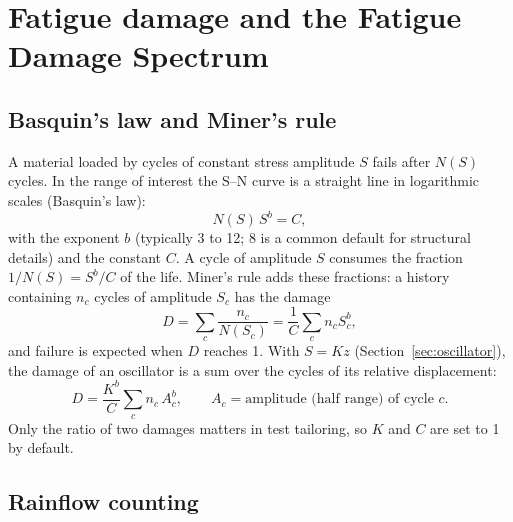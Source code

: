 \section{Fatigue damage and the Fatigue Damage Spectrum}\label{sec:damage}

\subsection{Basquin's law and Miner's rule}

A material loaded by cycles of constant stress amplitude $S$ fails after $N(S)$ cycles. In the range
of interest the S--N curve is a straight line in logarithmic scales (Basquin's law):
\begin{equation}
  N(S)\,S^b = C ,
\end{equation}
with the exponent $b$ (typically 3 to 12; 8 is a common default for structural details) and the
constant $C$. A cycle of amplitude $S$ consumes the fraction $1/N(S) = S^b/C$ of the life.
Miner's rule adds these fractions: a history containing $n_c$ cycles of amplitude $S_c$ has the damage
\begin{equation}\label{eq:miner}
  D = \sum_c \frac{n_c}{N(S_c)} = \frac1C\sum_c n_c S_c^b ,
\end{equation}
and failure is expected when $D$ reaches 1. With $S = Kz$ (Section~\ref{sec:oscillator}), the damage
of an oscillator is a sum over the cycles of its relative displacement:
\begin{equation}\label{eq:minerz}
  D = \frac{K^b}{C}\sum_c n_c\, A_c^b ,\qquad A_c = \text{amplitude (half range) of cycle } c .
\end{equation}
Only the ratio of two damages matters in test tailoring, so $K$ and $C$ are set to 1 by default.

\subsection{Rainflow counting}\label{sec:rainflow}


